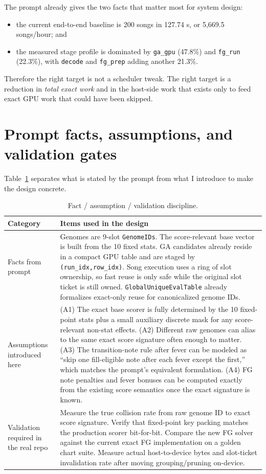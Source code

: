 \documentclass[11pt]{article}
\newcommand{\sphbase}{5,669.5}
\begin{document}
The prompt already gives the two facts that matter most for system design:
\begin{itemize}
    \item the current end-to-end baseline is 200 songs in 127.74 s, or \sphbase{} songs/hour; and
    \item the measured stage profile is dominated by \texttt{ga\_gpu} (47.8\%) and \texttt{fg\_run} (22.3\%), with \texttt{decode} and \texttt{fg\_prep} adding another 21.3\%.
\end{itemize}

Therefore the right target is not a scheduler tweak. The right target is a reduction in \emph{total exact work} and in the host-side work that exists only to feed exact GPU work that could have been skipped.

\section{Prompt facts, assumptions, and validation gates}

Table~\ref{tab:assumptions} separates what is stated by the prompt from what I introduce to make the design concrete.

\begin{table}[H]
\centering
\caption{Fact / assumption / validation discipline.}
\label{tab:assumptions}
\small
\begin{tabularx}{\textwidth}{>{\raggedright\arraybackslash}p{}X}
\toprule
\textbf{Category} & \textbf{Items used in the design} \\
\midrule
Facts from prompt & Genomes are 9-slot \texttt{GenomeIDs}. The score-relevant base vector is built from the 10 fixed stats. GA candidates already reside in a compact GPU table and are staged by \texttt{(run\_idx,row\_idx)}. Song execution uses a ring of slot ownership, so fast reuse is only safe while the original slot ticket is still owned. \texttt{GlobalUniqueEvalTable} already formalizes exact-only reuse for canonicalized genome IDs. \\
\midrule
Assumptions introduced here & (A1) The exact base scorer is fully determined by the 10 fixed-point stats plus a small auxiliary discrete mask for any score-relevant non-stat effects. (A2) Different raw genomes can alias to the same exact score signature often enough to matter. (A3) The transition-note rule after fever can be modeled as ``skip one fill-eligible note after each fever except the first,'' which matches the prompt's equivalent formulation. (A4) FG note penalties and fever bonuses can be computed exactly from the existing score semantics once the exact signature is known. \\
\midrule
Validation required in the real repo & Measure the true collision rate from raw genome ID to exact score signature. Verify that fixed-point key packing matches the production scorer bit-for-bit. Compare the new FG solver against the current exact FG implementation on a golden chart suite. Measure actual host-to-device bytes and slot-ticket invalidation rate after moving grouping/pruning on-device. \\
\bottomrule
\end{tabularx}
\end{table}
\end{document}

